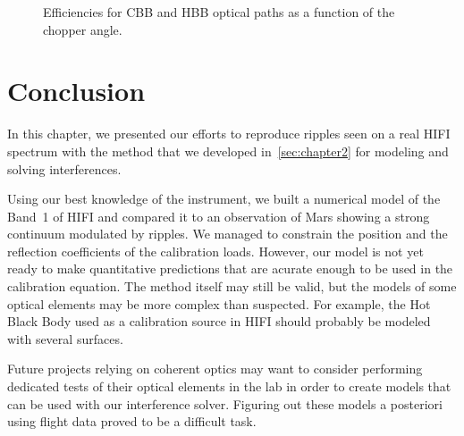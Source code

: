 \begin{figure}[hbtp]
    \centering
    \caption{Efficiencies for CBB and HBB optical paths as a function of the chopper angle.}
    \label{fig:band1_loads_coupling}
\end{figure}



\section{Conclusion}
In this chapter, we presented our efforts to reproduce ripples seen on a real HIFI spectrum with the method that we developed in~\cref{sec:chapter2} for modeling and solving interferences.

Using our best knowledge of the instrument, we built a numerical model of the Band~1 of HIFI and compared it to an observation of Mars showing a strong continuum modulated by ripples.
We managed to constrain the position and the reflection coefficients of the calibration loads.
However, our model is not yet ready to make quantitative predictions that are acurate enough to be used in the calibration equation.
The method itself may still be valid, but the models of some optical elements may be more complex than suspected.
For example, the Hot Black Body used as a calibration source in HIFI should probably be modeled with several surfaces.

Future projects relying on coherent optics may want to consider performing dedicated tests of their optical elements in the lab in order to create models that can be used with our interference solver.
Figuring out these models a posteriori using flight data proved to be a difficult task.
